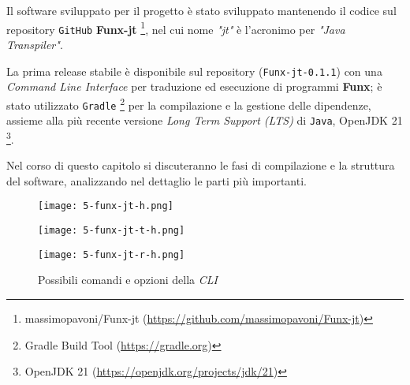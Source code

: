 \chapter{}
\label{chap:5-compiler}

Il software sviluppato per il progetto è stato sviluppato mantenendo il codice sul repository \texttt{GitHub} \textbf{Funx-jt}%
\footnote{massimopavoni/Funx-jt (\url{https://github.com/massimopavoni/Funx-jt})},
nel cui nome \textit{"jt"} è l'acronimo per \textit{"Java Transpiler"}.

\noindent La prima release stabile è disponibile sul repository (\texttt{Funx-jt-0.1.1})
con una \textit{Command Line Interface} per traduzione ed esecuzione di programmi \textbf{Funx};
è stato utilizzato \texttt{Gradle}%
\footnote{Gradle Build Tool (\url{https://gradle.org})}
per la compilazione e la gestione delle dipendenze,
assieme alla più recente versione \textit{Long Term Support (LTS)} di \texttt{Java}, OpenJDK 21%
\footnote{OpenJDK 21 (\url{https://openjdk.org/projects/jdk/21})}.

Nel corso di questo capitolo si discuteranno le fasi di compilazione e la struttura del software,
analizzando nel dettaglio le parti più importanti.

\begin{figure}
    \vspace{4mm}
    \begin{minipage}{0.85\textwidth}
        \texttt{[image: 5-funx-jt-h.png]}
        \vspace{2mm}
    \end{minipage}
    \begin{minipage}{0.85\textwidth}
        \texttt{[image: 5-funx-jt-t-h.png]}
        \vspace{2mm}
    \end{minipage}
    \begin{minipage}{0.85\textwidth}
        \texttt{[image: 5-funx-jt-r-h.png]}
    \end{minipage}
    \caption{Possibili comandi e opzioni della \textit{CLI}}
    \label{fig:5-compiler-cli}
\end{figure}

\newpage



\newpage



\newpage



\newpage

